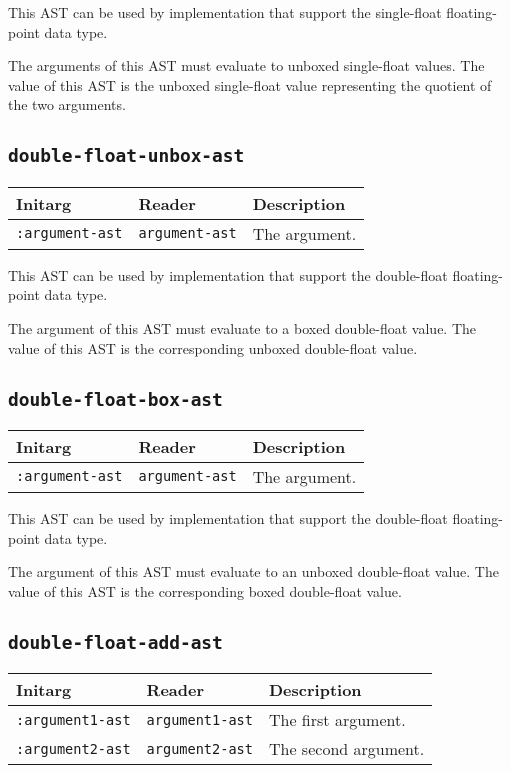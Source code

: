This AST can be used by implementation that support the single-float
floating-point data type.  

The arguments of this AST must evaluate to unboxed single-float
values.  The value of this AST is the unboxed single-float value
representing the quotient of the two arguments.

\subsection{\texttt{double-float-unbox-ast}}
\label{sec-ast-double-float-unbox}

\begin{tabular}{|l|l|l|}
\hline
Initarg & Reader & Description\\
\hline\hline
\texttt{:argument-ast} & \texttt{argument-ast} & The argument.\\
\hline
\end{tabular}

This AST can be used by implementation that support the double-float
floating-point data type.  

The argument of this AST must evaluate to a boxed double-float value.
The value of this AST is the corresponding unboxed double-float value.

\subsection{\texttt{double-float-box-ast}}
\label{sec-ast-double-float-box}

\begin{tabular}{|l|l|l|}
\hline
Initarg & Reader & Description\\
\hline\hline
\texttt{:argument-ast} & \texttt{argument-ast} & The argument.\\
\hline
\end{tabular}

This AST can be used by implementation that support the double-float
floating-point data type.  

The argument of this AST must evaluate to an unboxed double-float
value.  The value of this AST is the corresponding boxed double-float
value.

\subsection{\texttt{double-float-add-ast}}
\label{sec-ast-double-float-add}

\begin{tabular}{|l|l|l|}
\hline
Initarg & Reader & Description\\
\hline\hline
\texttt{:argument1-ast} & \texttt{argument1-ast} & The first argument.\\
\hline
\texttt{:argument2-ast} & \texttt{argument2-ast} & The second argument.\\
\hline
\end{tabular}

